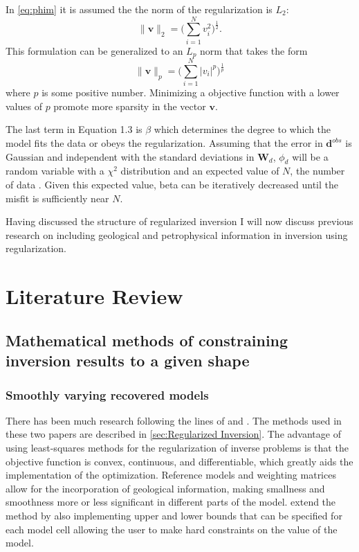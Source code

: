 In \autoref{eq:phim} it is assumed the the norm of the regularization is $L_2$: 
\begin{equation}
\|\mathbf v\|_2 = \Big(\sum_{i=1}^N v_i^2\Big)^{\frac{1}{2}}.
\end{equation}
\label{eq:l2}
This formulation can be generalized to an $L_p$ norm that takes the form
\begin{equation}
\|\mathbf v\|_p = \Big(\sum_{i=1}^N |v_i|^p\Big)^{\frac{1}{p}}
\end{equation}
\label{eq:lp}
where $p$ is some positive number. Minimizing a objective function with a lower values of $p$ promote more sparsity in the vector $\mathbf v$.

The last term in Equation 1.3 is $\beta$ which determines the degree to which the model fits the data or obeys the regularization. Assuming that the error in $\mathbf d^{obs}$ is Gaussian  and  independent with the standard deviations in $\mathbf W_d$, $\phi_d$ will be a random variable with a $\chi^2$ distribution and an expected value of $N$, the number of data \cite{oldenburg2005inversion}. Given this expected value, beta can be iteratively decreased until the misfit is sufficiently near $N$.

Having discussed the structure of regularized inversion I will now discuss previous research on including geological and petrophysical information in inversion using regularization.

\section{Literature Review}
\label{sec:Literature Review}

\subsection{Mathematical methods of constraining inversion results to a given shape}
\label{subsec:litrevMathMethods}

\subsubsection{Smoothly varying recovered models}
\label{subsubsec:smooth}
There has been much research following the lines of \cite{li19963} and \cite{li19983}. The methods used in these two papers are described in \autoref{sec:Regularized Inversion}. The advantage of using least-squares methods for the regularization of inverse problems is that the objective function is convex, continuous, and differentiable, which greatly aids the implementation of the optimization. Reference models and weighting matrices allow for the incorporation of geological information, making smallness and smoothness more or less significant in different parts of the model. \cite{li2003fast} extend the method by also implementing upper and lower bounds that can be specified for each model cell allowing the user to make hard constraints on the value of the model.

